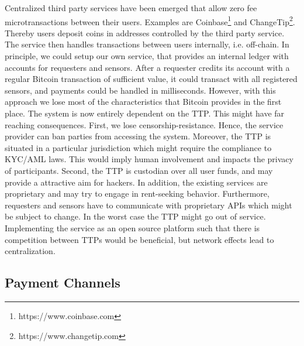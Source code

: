 Centralized third party services have been emerged that allow zero fee microtransactions between their users. Examples are Coinbase\footnote{https://www.coinbase.com} and ChangeTip\footnote{https://www.changetip.com}. Thereby users deposit coins in addresses controlled by the third party service. The service then handles transactions between users internally, i.e. off-chain. In principle, we could setup our own service, that provides an internal ledger with accounts for requesters and sensors. After a requester credits its account with a regular Bitcoin transaction of sufficient value, it could transact with all registered sensors, and payments could be handled in milliseconds. However, with this approach we lose most of the characteristics that Bitcoin provides in the first place. The system is now entirely dependent on the \ac{TTP}. This might have far reaching consequences. First, we lose censorship-resistance. Hence, the service provider can ban parties from accessing the system. Moreover, the \ac{TTP} is situated in a particular jurisdiction which might require the compliance to \ac{KYC}/\ac{AML} laws. This would imply human involvement and impacts the privacy of participants. Second, the \ac{TTP} is custodian over all user funds, and may provide a attractive aim for hackers. In addition, the existing services are proprietary and may try to engage in rent-seeking behavior. Furthermore, requesters and sensors have to communicate with proprietary \ac{API}s which might be subject to change. In the worst case the \ac{TTP} might go out of service. Implementing the service as an open source platform such that there is competition between \ac{TTP}s would be beneficial, but network effects lead to centralization.


\subsection{Payment Channels}
\label{sec:paymentchannels}


